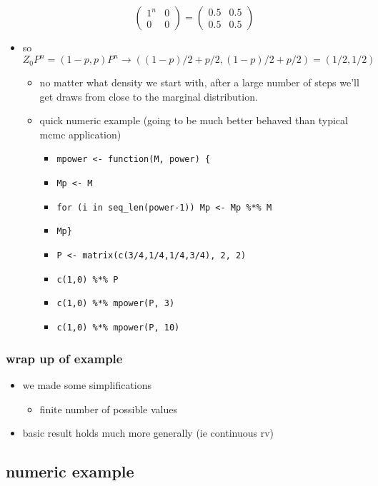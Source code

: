 \documentclass[11pt]{article}
\begin{document}
\begin{itemize}
\[\begin{pmatrix}
        1^n & 0 \\ 0 & 0 \end{pmatrix} = \begin{pmatrix} 0.5 & 0.5
        \\ 0.5 & 0.5 \end{pmatrix}\]
\item so $Z_0 P^n = (1-p, p) P^n \to ((1-p)/2 + p/2, (1-p)/2 +
        p/2) = (1/2, 1/2)$
\begin{itemize}
\item no matter what density we start with, after a large number
          of steps we'll get draws from close to the marginal
          distribution.
\item quick numeric example (going to be much better behaved than
          typical mcmc application)
\begin{itemize}
\item \texttt{mpower <- function(M, power) \{}
\item \texttt{Mp <- M}
\item \texttt{for (i in seq\_len(power-1)) Mp <- Mp \%*\% M}
\item \texttt{Mp\}}
\item \texttt{P <- matrix(c(3/4,1/4,1/4,3/4), 2, 2)}
\item \texttt{c(1,0) \%*\% P}
\item \texttt{c(1,0) \%*\% mpower(P, 3)}
\item \texttt{c(1,0) \%*\% mpower(P, 10)}
\end{itemize}
\end{itemize}
\end{itemize}
\subsubsection{wrap up of example}
\label{sec-3-2-3}

\begin{itemize}
\item we made some simplifications
\begin{itemize}
\item finite number of possible values
\end{itemize}
\item basic result holds much more generally (ie continuous rv)
\end{itemize}
\subsection{numeric example}
\label{sec-3-3}
\end{document}
